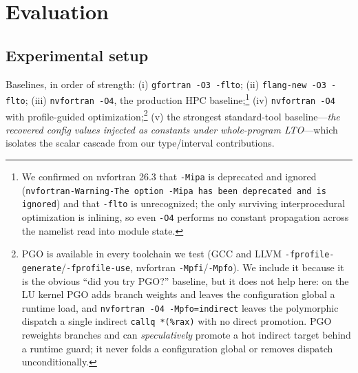 \section{Evaluation}
\label{sec:eval}


\subsection{Experimental setup}
\label{sec:eval:setup}
Baselines, in order of strength: (i) \texttt{gfortran -O3 -flto}; (ii) \texttt{flang-new -O3 -flto}; (iii) \texttt{nvfortran -O4}, the production HPC baseline;\footnote{We confirmed on nvfortran 26.3 that \texttt{-Mipa} is deprecated and ignored (\texttt{nvfortran-Warning-The option -Mipa has been deprecated and is ignored}) and that \texttt{-flto} is unrecognized; the only surviving interprocedural optimization is inlining, so even \texttt{-O4} performs no constant propagation across the namelist read into module state.} (iv) \texttt{nvfortran -O4} with profile-guided optimization;\footnote{PGO is available in every toolchain we test (GCC and LLVM \texttt{-fprofile-generate}/\texttt{-fprofile-use}, nvfortran \texttt{-Mpfi}/\texttt{-Mpfo}). We include it because it is the obvious ``did you try PGO?'' baseline, but it does not help here: on the LU kernel PGO adds branch weights and leaves the configuration global a runtime load, and \texttt{nvfortran -O4 -Mpfo=indirect} leaves the polymorphic dispatch a single indirect \texttt{callq *(\%rax)} with no direct promotion. PGO reweights branches and can \emph{speculatively} promote a hot indirect target behind a runtime guard; it never folds a configuration global or removes dispatch unconditionally.} (v) the strongest standard-tool baseline---\emph{the recovered config values injected as constants under whole-program LTO}---which isolates the scalar cascade from our type/interval contributions.

